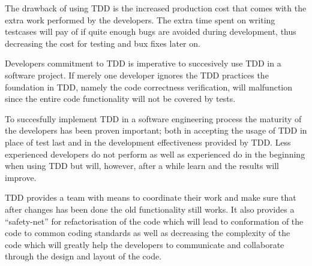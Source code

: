 The drawback of using TDD is the increased production cost that comes with the extra work performed by the developers.
The extra time spent on writing testcases will pay of if quite enough bugs are avoided during development, thus decreasing the cost for testing and bux fixes later on.

Developers commitment to TDD is imperative to succesively use TDD in a software project. If merely one developer ignores the TDD practices the foundation in TDD, namely the code correctness verification, will malfunction since the entire code functionality will not be covered by tests.

To succesfully implement TDD in a software engineering process the maturity of the developers has been proven important; both in accepting the usage of TDD in place of test last and in the development effectiveness provided by TDD.
Less experienced developers do not perform as well as experienced do in the beginning when using TDD but will, however, after a while learn and the results will improve.

TDD provides a team with means to coordinate their work and make sure that after changes has been done the old functionality still works. It also provides a ``safety-net'' for refactorisation of the code which will lead to conformation of the code to common coding standards as well as decreasing the complexity of the code which will  greatly help the developers to communicate and collaborate through the design and layout of the code.


